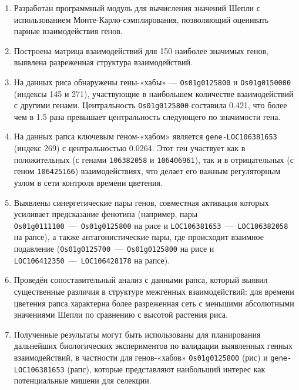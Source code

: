 \begin{enumerate}
	\item Разработан программный модуль для вычисления значений 
	Шепли с использованием Монте-Карло-сэмплирования, позволяющий 
	оценивать парные взаимодействия генов.
	
	\item Построена матрица взаимодействий для 150 наиболее значимых 
	генов, выявлена разреженная структура взаимодействий.
	
	\item На данных риса обнаружены гены-«хабы» — \texttt{Os01g0125800} 
	и \texttt{Os01g0150000} (индексы 145 и 271), участвующие в 
	наибольшем количестве взаимодействий с другими генами. 
	Центральность \texttt{Os01g0125800} составила 0.421, что более 
	чем в 1.5 раза превышает центральность следующего по значимости 
	гена.
	
	\item На данных рапса ключевым геном-«хабом» является 
	\texttt{gene-LOC106381653} (индекс 269) с центральностью 0.0264. 
	Этот ген участвует как в положительных (с генами \texttt{106382058} 
	и \texttt{106406961}), так и в отрицательных (с геном 
	\texttt{106425166}) взаимодействиях, что делает его важным 
	регуляторным узлом в сети контроля времени цветения.
	
	\item Выявлены синергетические пары генов, совместная активация 
	которых усиливает предсказание фенотипа (например, пары 
	\texttt{Os01g0111100}~---~\texttt{Os01g0125800} на рисе и 
	\texttt{LOC106381653}~---~\texttt{LOC106382058} на рапсе), 
	а также антагонистические пары, где происходит взаимное 
	подавление (\texttt{Os01g0125700}~---~\texttt{Os01g0125800} 
	на рисе и \texttt{LOC106412350}~---~\texttt{LOC106428178} на рапсе).
	
	\item Проведён сопоставительный анализ с данными рапса, который 
	выявил существенные различия в структуре межгенных взаимодействий: 
	для времени цветения рапса характерна более разреженная сеть 
	с меньшими абсолютными значениями Шепли по сравнению с высотой 
	растения риса.
	
	\item Полученные результаты могут быть использованы для планирования 
	дальнейших биологических экспериментов по валидации выявленных 
	генных взаимодействий, в частности для генов-«хабов» 
	\texttt{Os01g0125800} (рис) и \texttt{gene-LOC106381653} (рапс), 
	которые представляют наибольший интерес как потенциальные 
	мишени для селекции.
\end{enumerate}


%
